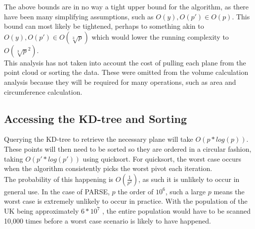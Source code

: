 The above bounds are in no way a tight upper bound for the algorithm, as there have been many simplifying assumptions, such as $O(y) , O(p') \in O(p)$. This bound can most likely be tightened, perhaps to something akin to $O(y),O(p') \in O(\sqrt[3]{p})$ which would lower the running complexity to $O(\sqrt[3]{p}^2)$.\\

This analysis has not taken into account the cost of pulling each plane from the point cloud or sorting the data. These were omitted from the volume calculation analysis because they will be required for many operations, such as area and circumference calculation.\\

\subsection{Accessing the KD-tree and Sorting}
Querying the KD-tree to retrieve the necessary plane will take $O(p*log(p))$. These points will then need to be sorted so they are ordered in a circular fashion, taking $O(p'*log(p'))$ using quicksort. For quicksort, the worst case occurs when the algorithm consistently picks the worst pivot each iteration.\\

The probability of this happening is $O(\frac{1}{p^2})$, as such it is unlikely to occur in general use. In the case of PARSE, $p$ the order of $10^6$, such a large $p$ means the worst case is extremely unlikely to occur in practice. With the population of the UK being approximately $6 * 10^7$ \cite{UnitedKingdomofGreatBritain2011}, the entire population would have to be scanned 10,000 times before a worst case scenario is likely to have happened.\\